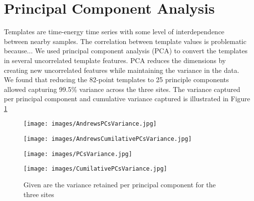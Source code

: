 \documentclass[11pt]{report}
\begin{document}


\section{Principal Component Analysis}

Templates are time-energy time series with some level of interdependence between nearby samples. The correlation between template values is problematic because...  We used principal component analysis (PCA) to convert the templates in several uncorrelated template features. PCA reduces the dimensions by creating new uncorrelated features while maintaining the variance in the data. We found that reducing the 82-point templates to 25 principle components allowed capturing 99.5\% variance across the three sites.
The variance captured per principal component and cumulative variance captured is illustrated in Figure \ref{PCAs}

\begin{figure}[ht]
    \centering
    \begin{minipage}{0.5\textwidth}
        \centering
        \texttt{[image: images/AndrewsPCsVariance.jpg]} %
    \end{minipage}\hfill
    \begin{minipage}{0.5\textwidth}
        \centering
        \texttt{[image: images/AndrewsCumilativePCsVariance.jpg]} %
    \end{minipage}
    \begin{minipage}{0.49\textwidth}
        \centering
        \texttt{[image: images/PCsVariance.jpg]} %
    \end{minipage}
    \begin{minipage}{0.49\textwidth}
        \centering
        \texttt{[image: images/CumilativePCsVariance.jpg]} %
    \end{minipage}
    \caption{Given are the variance retained per principal component for the three sites}
    \label{PCAs}
\end{figure}
\end{document}
